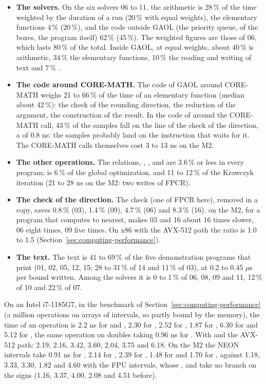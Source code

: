 \documentclass[12pt,a4paper,twoside,openright]{book}
\begin{document}
\begin{itemize}
\item[$\bullet$] \textbf{The solvers.} On the six solvers 06 to 11, the
arithmetic is 28\,\% of the time weighted by the duration of a run (20\,\%
with equal weights), the elementary functions 4\,\% (20\,\%), and the code
outside GAOL (the priority queue,  of the boxes, the program
itself) 62\,\% (45\,\%). The weighted figures are those of 06, which lasts
80\,\% of the total. Inside GAOL, at equal weights, about 40\,\% is
arithmetic, 34\,\% the elementary functions, 10\,\% the reading and writing
of text and 7\,\% .
\item[$\bullet$] \textbf{The code around CORE-MATH.} The code of GAOL around
CORE-MATH weighs 21 to 66\,\% of the time of an elementary function (median
about 42\,\%): the check of the rounding direction, the reduction of the
argument, the construction of the result. In the code of  around
the CORE-MATH call, 43\,\% of the samples fall on the line of the check of
the direction, a  of 0.8 ns: the samples probably land on the
instruction that waits for it. The CORE-MATH calls themselves cost 3 to
13 ns on the M2.
\item[$\bullet$] \textbf{The other operations.} The relations, ,
,  and  are 3.6\,\% or less in every
program;  is 6\,\% of the global optimization, and
 11 to 12\,\% of the Krawczyk iteration (21 to 28 ns on the
M2: two writes of FPCR).
\item[$\bullet$] \textbf{The check of the direction.} The check (one
 of FPCR here), removed in a copy, saves 0.8\,\% (03), 1.4\,\%
(09), 4.7\,\% (06) and 8.3\,\% (16).  on the
M2, for a program that computes to nearest, makes 03 and 16 about 16 times
slower, 06 eight times, 09 five times. On x86 with the AVX-512 path the
ratio is 1.0 to 1.5 (Section~\ref{sec:computing-performance}).
\item[$\bullet$] \textbf{The text.} The text is 41 to 69\,\% of the five
demonstration programs that print (01, 02, 05, 12, 15; 28 to 31\,\% of 14 and
11\,\% of 03), at 0.2 to 0.45 $\mu$s per bound written. Among the solvers it
is 0 to 1\,\% of 06, 08, 09 and 11, 12\,\% of 10 and 22\,\% of 07.
\end{itemize}

\medskip
\noindent On an Intel i7-1185G7, in the benchmark of
Section~\ref{sec:computing-performance} (a million operations on arrays of
intervals, so partly bound by the memory), the time of an operation is 2.2 ns
for \code{+} and \code{-}, 2.30 for \code{*}, 2.52 for \code{/}, 1.87 for
, 6.30 for  and 5.12 for , the same
operation on doubles taking 0.96 ns for \code{+}. With
 and the AVX-512 path: 2.19, 2.16, 3.42,
3.60, 2.04, 3.75 and 6.18. On the M2 the NEON intervals take 0.91 ns for
\code{+}, 2.14 for \code{*}, 2.39 for \code{/}, 1.48 for  and 1.70
for , against 1.18, 3.33, 3.30, 1.82 and 4.60 with the FPU
intervals, whose \code{*}, \code{/} and  take no branch on the
signs (1.16, 3.37, 4.00, 2.08 and 4.51 before).
\end{document}
